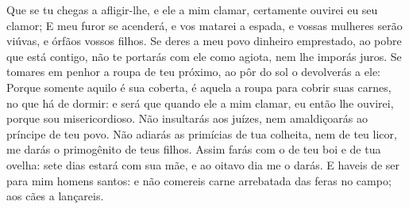 {{  Que se tu chegas a afligir-lhe, e ele a mim clamar, certamente ouvirei eu seu clamor;
  E meu furor se acenderá, e vos matarei a espada, e vossas mulheres serão viúvas, e órfãos vossos filhos.
  Se deres a meu povo dinheiro emprestado, ao pobre que está contigo, não te portarás com ele como agiota, nem lhe imporás juros.
  Se tomares em penhor a roupa de teu próximo, ao pôr do sol o devolverás a ele: %
  Porque somente aquilo é sua coberta, é aquela a roupa para cobrir suas carnes, no que há de dormir: e será que quando ele a mim clamar, eu então lhe ouvirei, porque sou misericordioso.
  Não insultarás aos juízes, nem amaldiçoarás ao príncipe de teu povo.
  Não adiarás as primícias de tua colheita, nem de teu licor, me darás o primogênito de teus filhos.
  Assim farás com o de teu boi e de tua ovelha: sete dias estará com sua mãe, e ao oitavo dia me o darás.
  E haveis de ser para mim homens santos: e não comereis carne arrebatada das feras no campo; aos cães a lançareis}.
\par }

